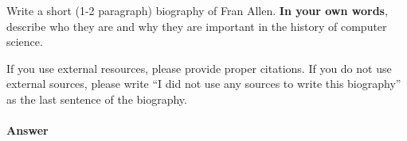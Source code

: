 \documentclass{article}
\begin{document}
\collab{\todo{}}

Write a short (1-2 paragraph) biography of Fran Allen.
\textbf{In your own words}, describe who they are and why they are important in
the history of computer science.

If you use external resources, please provide
proper citations. If you do not use external sources, please write ``I did not
use any sources to write this biography'' as the last sentence of the
biography.

\paragraph{Answer}


% 
% 
\end{document}
